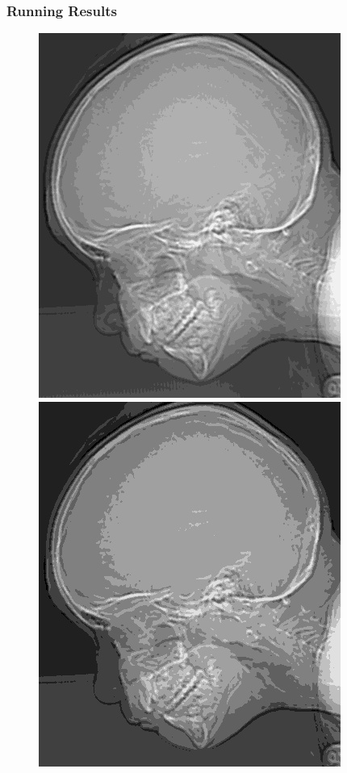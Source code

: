 \documentclass[notheorems,serif,table,compress]{beamer}  %
\begin{document}
\begin{frame}
\frametitle{Running Results}
\begin{figure}
        \begin{minipage}[t]{0.4\linewidth}
        \centering
        \includegraphics[width=0.8\linewidth]{k=4.jpg} 
        \end{minipage}
        \begin{minipage}[t]{0.4\linewidth}
        \centering
        \includegraphics[width=0.8\linewidth]{k=3.jpg} 

\end{minipage}
\end{figure}
\end{frame}
\end{document}
